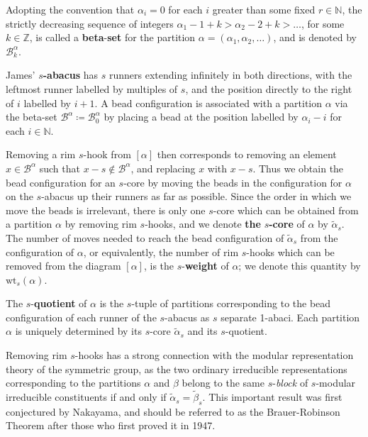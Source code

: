 \documentclass[10pt]{amsart}
\begin{document}

Adopting the convention that $\alpha_i=0$ for each $i$ greater than some fixed $r\in\mathbb{N}$, the strictly decreasing sequence of integers $\alpha_1-1+k>\alpha_2-2+k>\dots$, for some $k\in\mathbb{Z}$, is called a \textbf{beta}-\textbf{set} for the partition $\alpha=(\alpha_1,\alpha_2,\dots)$, and is denoted by $\mathcal{B}^\alpha_k$. 


James' $s$\textbf{-abacus} has $s$ runners extending infinitely in both directions, with the leftmost runner labelled by multiples of $s$, and the position directly to the right of $i$ labelled by $i+1$. A bead configuration is associated with a partition $\alpha$ via the beta-set $\mathcal{B}^\alpha\coloneqq\mathcal{B}^\alpha_0$ by placing a bead at the position labelled by $\alpha_i-i$ for each $i\in\mathbb{N}$. 

Removing a rim $s$-hook from $[\alpha]$ then corresponds to removing an element $x\in\mathcal{B}^\alpha$ such that $x-s\not\in\mathcal{B}^\alpha$, and replacing $x$ with $x-s$. Thus we obtain the bead configuration for an $s$-core by moving the beads in the configuration for $\alpha$ on the $s$-abacus up their runners as far as possible. Since the order in which we move the beads is irrelevant, there is only one $s$-core which can be obtained from a partition $\alpha$ by removing rim $s$-hooks, and we denote \textbf{the} $s$\textbf{-core} of $\alpha$ by $\tilde{\alpha}_s$. The number of moves needed to reach the bead configuration of $\tilde{\alpha}_s$ from the configuration of $\alpha$, or equivalently, the number of rim $s$-hooks which can be removed from the diagram $[\alpha]$, is the $s$-\textbf{weight} of $\alpha$; we denote this quantity by $\text{wt}_s(\alpha)$. 

The $s$-\textbf{quotient} of $\alpha$ is the $s$-tuple of partitions corresponding to the bead configuration of each runner of the $s$-abacus as $s$ separate 1-abaci. Each partition $\alpha$ is uniquely determined by its $s$-core $\tilde{\alpha}_s$ and its $s$-quotient. 


Removing rim $s$-hooks has a strong connection with the modular representation theory of the symmetric group, as the two ordinary irreducible representations corresponding to the partitions $\alpha$ and $\beta$ belong to the same $s$-\textit{block} of $s$-modular irreducible constituents if and only if $\tilde{\alpha}_s=\tilde{\beta}_s$. This important result was first conjectured by Nakayama, and should be referred to as the Brauer-Robinson Theorem after those who first proved it in 1947.
\end{document}
